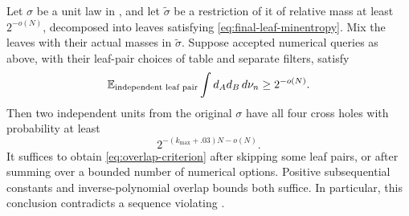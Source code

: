 \begin{proposition}\label{prop:collision}
Let $\sigma$ be a unit law in ,
and let $\widetilde\sigma$ be a restriction of it of relative
mass at least $2^{-o(N)}$, decomposed into leaves satisfying
\eqref{eq:final-leaf-minentropy}.  Mix the leaves with their
actual masses in $\widetilde\sigma$.
Suppose accepted numerical queries as above, with their
leaf-pair choices of table and separate filters, satisfy
\begin{equation}\label{eq:overlap-criterion}
 \mathbb E_{\text{independent leaf pair}}
       \int d_A d_B\,d\nu_n\ge 2^{-o(N)}.
\end{equation}
Then two independent units from the original $\sigma$ have
all four cross holes with probability at least
\begin{equation}\label{eq:collision-conclusion}
 2^{-(k_{\max}+.03)N-o(N)}.
\end{equation}
It suffices to obtain \eqref{eq:overlap-criterion} after skipping
some leaf pairs, or after summing over a bounded number of
numerical options.  Positive subsequential constants and
inverse-polynomial overlap bounds both suffice.  In particular,
this conclusion contradicts a sequence violating
.
\end{proposition}
